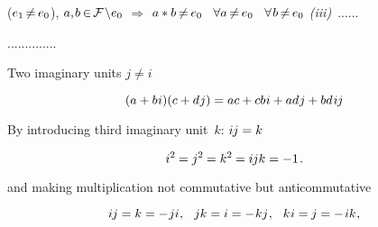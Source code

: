 (${e_{1} \hspace{-0.3ex} \neq \hspace{-0.2ex} e_{0}}$),
${a, \hspace{-0.2ex} b \hspace{-0.2ex} \in \hspace{-0.3ex} \mathcal{F} \hspace{-0.3ex} \setminus \hspace{-0.5ex} e_{0}}$
$\Rightarrow$
${a * b \hspace{-0.2ex} \neq \hspace{-0.2ex} e_{0}}$
~${\forall a {\hspace{.4ex} \neq \hspace{.4ex}} e_{0}}$
~${\forall \hspace{.2ex} b {\hspace{.4ex} \neq \hspace{.4ex}} e_{0}}$
\textit{(iii)}~......


..............

Two imaginary units
${j \neq i}$

\begin{equation*}
( a + b \hspace{.1ex} i ) ( c + d \hspace{.1ex} j )
= ac + cb \hspace{.1ex} i + ad \hspace{.1ex} j + bd \hspace{.2ex} i \hspace{-0.1ex} j
\end{equation*}

By introducing
third
imaginary unit~$k$\::
${i \hspace{-0.1ex} j = k}$

\begin{equation}\label{theformulaforquaternions}
i^2 \hspace{-0.1ex} = j^2 \hspace{-0.1ex} = k^2 \hspace{-0.1ex} = i \hspace{-0.1ex} j k = -1
\hspace{.2ex} .
\end{equation}

\noindent
and making multiplication
not commutative but anticommutative

\begin{equation}\label{moredefinitionalequationsforquaternions}
i \hspace{-0.1ex} j = k = - \hspace{.1ex} ji \hspace{.1ex} , \hspace{.7em}
jk = i = - \hspace{.1ex} kj \hspace{.1ex} , \hspace{.7em}
k \hspace{.1ex} i = \hspace{-0.1ex} j = - \hspace{.2ex} ik \hspace{.1ex} ,
\end{equation}

